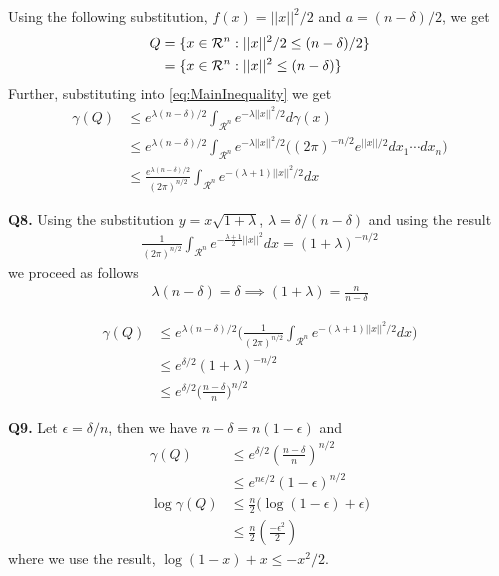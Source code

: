 \documentclass[11pt]{article}
\begin{document}
Using the following substitution, $f(x) = ||x||^2 /2$ and $a = (n - \delta )/2$, we get
\begin{align}
Q &= \{x\in \mathcal{R}^n : ||x||^2 /2 \leq (n - \delta )/2 \}\notag \\ 
&= \{x\in \mathcal{R}^n : ||x||^2  \leq (n - \delta) \}
\end{align}
Further, substituting into \eqref{eq:MainInequality} we get
\begin{align*}
\gamma(Q) &\leq e^{\lambda (n - \delta)/2} \int_{\mathcal{R}^n} e^{-\lambda ||x||^2/2} d\gamma(x)\\
&\leq e^{\lambda (n - \delta)/2} \int_{\mathcal{R}^n} e^{-\lambda ||x||^2/2} \bigg((2\pi)^{-n/2}e^{||x||/2} dx_1 \cdots dx_n \bigg)\\
&\leq \frac{e^{\lambda (n - \delta)/2}}{(2\pi)^{n/2}} \int_{\mathcal{R}^n} e^{-(\lambda + 1)||x||^2 /2} dx
\end{align*}

\hrulefill \vspace{2 pt} 

\textbf{Q8. }
Using the substitution $y = x\sqrt{1 + \lambda}$, $\lambda = \delta/ (n - \delta)$ and using the result
\begin{align}
\frac{1}{(2\pi)^{n/2}} \int_{\mathcal{R}^n} e^{-\frac{\lambda + 1}{2} ||x||^2}dx = (1 + \lambda)^{-n/2}
\end{align}
we proceed as follows
\begin{align*}
\lambda(n - \delta) = \delta \implies (1 + \lambda) = \frac{n}{n - \delta}
\end{align*}

\begin{align*}
\gamma(Q) &\leq e^{\lambda (n - \delta)/2} \bigg( \frac{1}{(2\pi)^{n/2}} \int_{\mathcal{R}^n} e^{-(\lambda + 1)||x||^2 /2} dx \bigg)\\
&\leq e^{\delta/2} (1 + \lambda)^{-n/2}\\
&\leq e^{\delta/2} \bigg(\frac{n  - \delta}{n}\bigg)^{n/2}
\end{align*}

\hrulefill \vspace{2 pt}

\textbf{Q9. }
Let $\epsilon = \delta/n $, then we have $n-\delta = n(1-\epsilon)$ and
\begin{align*}
\gamma(Q) &\leq e^{\delta/2}(\frac{n-\delta}{n})^{n/2}\\
&\leq e^{n\epsilon /2}(1 - \epsilon)^{n/2}\\
\log{\gamma(Q)} &\leq  \frac{n}{2}\big( \log(1-\epsilon) + \epsilon \big)\\
&\leq \frac{n}{2}(\frac{- \epsilon^2}{2})
\end{align*}
where we use the result, $\log(1-x)+x \leq -x^2/2$.
\end{document}
